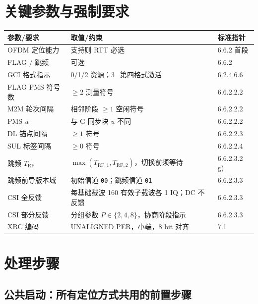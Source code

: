 \documentclass[11pt,a4paper]{ctexart}
\begin{document}
\section{关键参数与强制要求}

\begin{table}[h]
\centering
\small
\begin{tabular}{L{3.2cm}L{4.5cm}L{5cm}}
\toprule
\textbf{参数/要求} & \textbf{取值/约束} & \textbf{标准指针} \\
\midrule
OFDM 定位能力 & 支持则 RTT 必选 & 6.6.2 首段 \\
FLAG / 跳频 & 可选 & 6.6.2 \\
GCI 格式指示 & 0/1/2 资源；3=第四格式激活 & 6.2.4.6.6 \\
FLAG PMS 符号数 & $\ge 2$ 测量符号 & 6.6.2.2.2 \\
M2M 轮次间隔 & 相邻阶段 $\ge 1$ 空闲符号 & 6.6.2.2.2 \\
PMS $u$ & 与 G 同步块 $u$ 不同 & 6.6.2.2.2 \\
DL 锚点间隔 & $\ge 1$ 符号 & 6.6.2.2.3 \\
SUL 标签间隔 & $\ge 0$ 符号 & 6.6.2.2.4 \\
跳频 $T_{\mathrm{RF}}$ & $\max(T_{\mathrm{RF},1},T_{\mathrm{RF},2})$，切换前须等待 & 6.6.2.3.2 g) \\
跳频前导版本域 & 初始信道 \texttt{00}；跳频信道 \texttt{01} & 6.6.2.3.3 \\
CSI 全反馈 & 每基础载波 160 有效子载波各 1 IQ；DC 不反馈 & 6.6.2.3.3 \\
CSI 部分反馈 & 分组参数 $P\in\{2,4,8\}$，协商阶段指示 & 6.6.2.3.3 \\
XRC 编码 & UNALIGNED PER，小端，8 bit 对齐 & 7.1 \\
\bottomrule
\end{tabular}
\end{table}

\section{处理步骤} 

\subsection{公共启动：所有定位方式共用的前置步骤}
\end{document}
